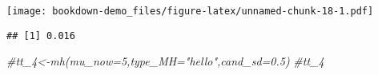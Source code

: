 \documentclass[]{book}
\newenvironment{Shaded}{\begin{snugshade}}{\end{snugshade}}
\newcommand{\DecValTok}[1]{\textcolor[rgb]{0.00,0.00,0.81}{#1}}
\newcommand{\CommentTok}[1]{\textcolor[rgb]{0.56,0.35,0.01}{\textit{#1}}}
\newcommand{\OperatorTok}[1]{\textcolor[rgb]{0.81,0.36,0.00}{\textbf{#1}}}
\newcommand{\NormalTok}[1]{#1}
\begin{document}
\texttt{[image: bookdown-demo\_files/figure-latex/unnamed-chunk-18-1.pdf]}

\begin{Shaded}
\end{Shaded}

\begin{verbatim}
## [1] 0.016
\end{verbatim}

\begin{Shaded}
\begin{Highlighting}[]
\CommentTok{#tt_4<-mh(mu_now=5,type_MH="hello",cand_sd=0.5)}
\CommentTok{#tt_4}
\end{Highlighting}
\end{Shaded}


\end{document}
